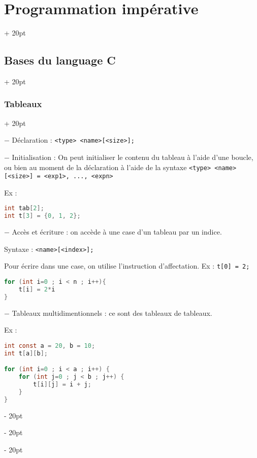 \documentclass[a4paper, 12pt, twoside]{article}
\newcommand{\ind}[1][20pt]{\advance\leftskip + #1}
\newcommand{\deind}[1][20pt]{\advance\leftskip - #1}
\newenvironment{indentedenv}[1][20pt]{\par \ind[#1]}{\par \deind}
\newenvironment{indt}[2][20pt]{#2 \begin{indentedenv}[#1]}{\end{indentedenv}} %
\begin{document}
\begin{indt}{\section{Programmation impérative}}
\begin{indt}{\subsection{Bases du language C}}
\begin{indt}{\subsubsection{Tableaux}}
                \vspace{12pt}
                
                $-$ Déclaration : \texttt{<type> <name>[<size>];}
                
                \vspace{6pt}
                
                $-$ Initialisation : On peut initialiser le contenu du tableau à l'aide d'une boucle, ou bien au moment de la déclaration à l'aide de la syntaxe \texttt{<type> <name>[<size>] = {<exp1>, ..., <expn>}}
                
                Ex :
                \begin{lstlisting}[language=C, xleftmargin=80pt]
int tab[2];
int t[3] = {0, 1, 2};
                \end{lstlisting}
                
                \vspace{12pt}
                
                $-$ Accès et écriture : on accède à une case d'un tableau par un indice.
                
                Syntaxe : \texttt{<name>[<index>];}
                
                Pour écrire dans une case, on utilise l'instruction d'affectation.
                Ex : \texttt{t[0] = 2;}
                    
                \begin{lstlisting}[language=C, xleftmargin=80pt]
for (int i=0 ; i < n ; i++){
    t[i] = 2*i
}
                \end{lstlisting}
                
                \vspace{12pt}
                
                $-$ Tableaux multidimentionnels : ce sont des tableaux de tableaux.
                
                Ex :
                    
                \begin{lstlisting}[language=C, xleftmargin=80pt]
int const a = 20, b = 10;
int t[a][b];

for (int i=0 ; i < a ; i++) {
    for (int j=0 ; j < b ; j++) {
        t[i][j] = i + j;
    }
}
                \end{lstlisting}
                
                \vspace{12pt}
                

\end{indt}
\end{indt}
\end{indt}
\end{document}
